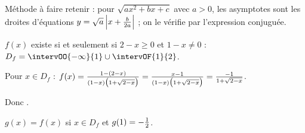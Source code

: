 \begin{noteprof}
Méthode à faire retenir : pour $\sqrt{ax^2+bx+c}$ avec $a>0$, les asymptotes sont les droites d'équations $y=\sqrt a\,\Big|x+\frac{b}{2a}\Big|$ ; on le vérifie par l'expression conjuguée.
\end{noteprof}
\begin{corrigeprof}[10]
\be
\item $f(x)$ existe si et seulement si $2-x\geq 0$ et $1-x\neq 0$ : $D_f=\intervOO{-\infty}{1}\cup\intervOF{1}{2}$.
\item Pour $x\in D_f$ : $f(x)=\frac{1-(2-x)}{(1-x)\big(1+\sqrt{2-x}\big)}=\frac{x-1}{(1-x)\big(1+\sqrt{2-x}\big)}=\frac{-1}{1+\sqrt{2-x}}$.
\par Donc .
\item $g(x)=f(x)$ si $x\in D_f$ et $g(1)=-\frac{1}{2}$.
\ee
\end{corrigeprof}
\ifenseignant %
